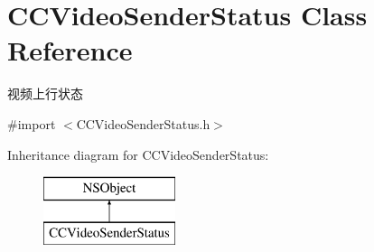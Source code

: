\hypertarget{interface_c_c_video_sender_status}{}\section{C\+C\+Video\+Sender\+Status Class Reference}
\label{interface_c_c_video_sender_status}


视频上行状态  




{\ttfamily \#import $<$C\+C\+Video\+Sender\+Status.\+h$>$}

Inheritance diagram for C\+C\+Video\+Sender\+Status\+:\begin{figure}[H]
\begin{center}
\leavevmode
\includegraphics[height=2.000000cm]{interface_c_c_video_sender_status}
\end{center}
\end{figure}
